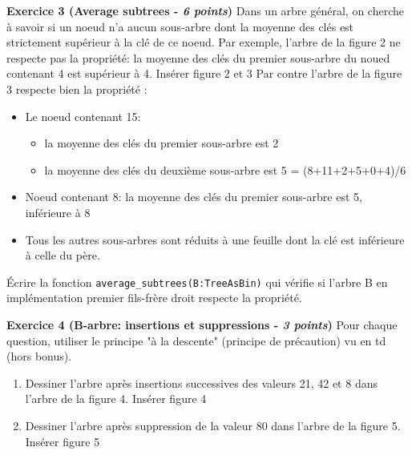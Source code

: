 \documentclass{article}
\begin{document}
\noindent\textbf{Exercice 3 (Average subtrees - \textit{6 points})}\newline
\indent Dans un arbre général, on cherche à savoir si un noeud n'a aucun sous-arbre dont la moyenne des clés est strictement supérieur à la clé de ce noeud.\newline
\indent Par exemple, l'arbre de la figure 2 ne respecte pas la propriété: la moyenne des clés du premier sous-arbre du noued contenant 4 est supérieur à 4.\newline
Insérer figure 2 et 3\newline
Par contre l'arbre de la figure 3 respecte bien la propriété :
\begin{itemize}
  \item Le noeud contenant 15:
  \begin{itemize}
    \item la moyenne des clés du premier sous-arbre est 2
    \item la moyenne des clés du deuxième sous-arbre est 5 = (8+11+2+5+0+4)/6
  \end{itemize}
  \item Noeud contenant 8: la moyenne des clés du premier sous-arbre est 5, inférieure à 8
  \item Tous les autres sous-arbres sont réduits à une feuille dont la clé est inférieure à celle du père.
\end{itemize}

Écrire la fonction \verb|average_subtrees(B:TreeAsBin)| qui vérifie si l'arbre B en implémentation premier fils-frère droit respecte la propriété.\newline

\noindent\textbf{Exercice 4 (B-arbre: insertions et suppressions - \textit{3 points})}\newline
Pour chaque question, utiliser le principe "à la descente" (principe de précaution) vu en td (hors bonus).
\begin{enumerate}
  \item Dessiner l'arbre après insertions successives des valeurs 21, 42 et 8 dans l'arbre de la figure 4.\newline
  Insérer figure 4
  \item Dessiner l'arbre après suppression de la valeur 80 dans l'arbre de la figure 5.\newline
  Insérer figure 5
\end{enumerate}
\end{document}
